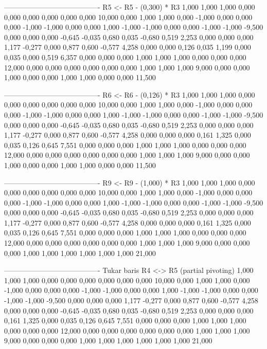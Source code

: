 \documentclass[12pt]{article}
\begin{document}
\begin{enumerate}
\begin{keluaran}
----------------------------------------
R5 <- R5 - (0,300) * R3
1,000   1,000   1,000   0,000   0,000   0,000   0,000   0,000   0,000   10,000
0,000   1,000   1,000   0,000   -1,000  0,000   0,000   0,000   -1,000  -1,000
0,000   0,000   1,000   -1,000  -1,000  0,000   0,000   -1,000  -1,000  -9,500
0,000   0,000   0,000   -0,645  -0,035  0,680   0,035   -0,680  0,519   2,253
0,000   0,000   0,000   1,177   -0,277  0,000   0,877   0,600   -0,577  4,258
0,000   0,000   0,126   0,035   1,199   0,000   0,035   0,000   0,519   6,357
0,000   0,000   0,000   1,000   1,000   1,000   0,000   0,000   0,000   12,000
0,000   0,000   0,000   0,000   0,000   0,000   1,000   1,000   1,000   9,000
0,000   0,000   1,000   0,000   0,000   1,000   1,000   0,000   0,000   11,500

----------------------------------------
R6 <- R6 - (0,126) * R3
1,000   1,000   1,000   0,000   0,000   0,000   0,000   0,000   0,000   10,000
0,000   1,000   1,000   0,000   -1,000  0,000   0,000   0,000   -1,000  -1,000
0,000   0,000   1,000   -1,000  -1,000  0,000   0,000   -1,000  -1,000  -9,500
0,000   0,000   0,000   -0,645  -0,035  0,680   0,035   -0,680  0,519   2,253
0,000   0,000   0,000   1,177   -0,277  0,000   0,877   0,600   -0,577  4,258
0,000   0,000   0,000   0,161   1,325   0,000   0,035   0,126   0,645   7,551
0,000   0,000   0,000   1,000   1,000   1,000   0,000   0,000   0,000   12,000
0,000   0,000   0,000   0,000   0,000   0,000   1,000   1,000   1,000   9,000
0,000   0,000   1,000   0,000   0,000   1,000   1,000   0,000   0,000   11,500

----------------------------------------
R9 <- R9 - (1,000) * R3
1,000   1,000   1,000   0,000   0,000   0,000   0,000   0,000   0,000   10,000
0,000   1,000   1,000   0,000   -1,000  0,000   0,000   0,000   -1,000  -1,000
0,000   0,000   1,000   -1,000  -1,000  0,000   0,000   -1,000  -1,000  -9,500
0,000   0,000   0,000   -0,645  -0,035  0,680   0,035   -0,680  0,519   2,253
0,000   0,000   0,000   1,177   -0,277  0,000   0,877   0,600   -0,577  4,258
0,000   0,000   0,000   0,161   1,325   0,000   0,035   0,126   0,645   7,551
0,000   0,000   0,000   1,000   1,000   1,000   0,000   0,000   0,000   12,000
0,000   0,000   0,000   0,000   0,000   0,000   1,000   1,000   1,000   9,000
0,000   0,000   0,000   1,000   1,000   1,000   1,000   1,000   1,000   21,000

----------------------------------------
Tukar baris R4 <-> R5 (partial pivoting)
1,000   1,000   1,000   0,000   0,000   0,000   0,000   0,000   0,000   10,000
0,000   1,000   1,000   0,000   -1,000  0,000   0,000   0,000   -1,000  -1,000
0,000   0,000   1,000   -1,000  -1,000  0,000   0,000   -1,000  -1,000  -9,500
0,000   0,000   0,000   1,177   -0,277  0,000   0,877   0,600   -0,577  4,258
0,000   0,000   0,000   -0,645  -0,035  0,680   0,035   -0,680  0,519   2,253
0,000   0,000   0,000   0,161   1,325   0,000   0,035   0,126   0,645   7,551
0,000   0,000   0,000   1,000   1,000   1,000   0,000   0,000   0,000   12,000
0,000   0,000   0,000   0,000   0,000   0,000   1,000   1,000   1,000   9,000
0,000   0,000   0,000   1,000   1,000   1,000   1,000   1,000   1,000   21,000


\end{keluaran}
\end{enumerate}
\end{document}
